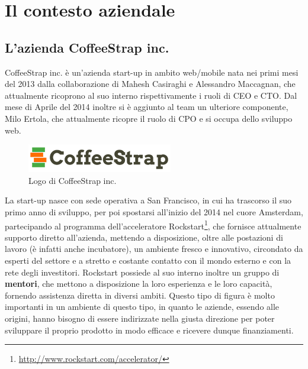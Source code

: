 
\chapter{Il contesto aziendale}
\label{cap:contesto-aziendale}

\section{L'azienda CoffeeStrap inc.}

CoffeeStrap inc. è un'azienda \gls{start-up} in ambito web/mobile nata nei primi mesi del 2013 dalla collaborazione di Mahesh Casiraghi e Alessandro Maccagnan, che attualmente ricoprono al suo interno rispettivamente i ruoli di \gls{CEO} e \gls{CTO}. Dal mese di Aprile del 2014 inoltre si è aggiunto al team un ulteriore componente, Milo Ertola, che attualmente ricopre il ruolo di \gls{CPO} e si occupa dello sviluppo web. 

\begin{figure}[htpd]
\centering
\includegraphics[width=\textwidth/2]{../immagini/coffeestrap-logo}
\caption{Logo di CoffeeStrap inc.}  
\end{figure}

La start-up nasce con sede operativa a San Francisco, in cui ha trascorso il suo primo anno di sviluppo, per poi spostarsi all'inizio del 2014 nel cuore Amsterdam, partecipando al programma dell'\gls{acceleratore} Rockstart\footnote{\url{http://www.rockstart.com/accelerator/}}, che fornisce attualmente supporto diretto all'azienda, mettendo a disposizione, oltre alle postazioni di lavoro (è infatti anche \gls{incubatore}), un ambiente fresco e innovativo, circondato da esperti del settore e a stretto e costante contatto con il mondo esterno e con la rete degli investitori. Rockstart possiede al suo interno inoltre un gruppo di \textbf{mentori}, che mettono a disposizione la loro esperienza e le loro capacità, fornendo assistenza diretta in diversi ambiti. Questo tipo di figura è molto importanti in un ambiente di questo tipo, in quanto le aziende, essendo alle origini, hanno bisogno di essere indirizzate nella giusta direzione per poter sviluppare il proprio prodotto in modo efficace e ricevere dunque finanziamenti.

